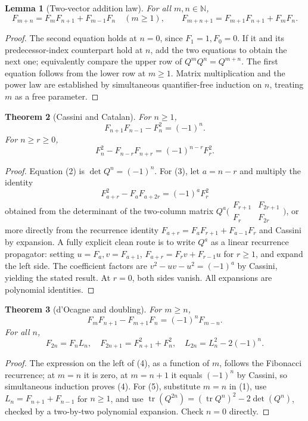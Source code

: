 \documentclass[11pt]{article}
\newtheorem{theorem}{Theorem}[section]
\newtheorem{lemma}[theorem]{Lemma}
\newcommand{\N}{\mathbb N}\newcommand{\Z}{\mathbb Z}
\begin{document}
\begin{lemma}[Two-vector addition law]\label{lem:add}
For all $m,n\in\N$,
\[ F_{m+n}=F_mF_{n+1}+F_{m-1}F_n\quad(m\ge1),\qquad F_{m+n+1}=F_{m+1}F_{n+1}+F_mF_n.\tag{1}\]
\end{lemma}
\begin{proof}
The second equation holds at $n=0$, since $F_1=1,F_0=0$. If it and its predecessor-index counterpart hold at $n$, add the two equations to obtain the next one; equivalently compare the upper row of $Q^mQ^n=Q^{m+n}$. The first equation follows from the lower row at $m\ge1$. Matrix multiplication and the power law are established by simultaneous quantifier-free induction on $n$, treating $m$ as a free parameter.
\end{proof}
\begin{theorem}[Cassini and Catalan]
For $n\ge1$,
\[F_{n+1}F_{n-1}-F_n^2=(-1)^n.\tag{2}\]
For $n\ge r\ge0$,
\[F_n^2-F_{n-r}F_{n+r}=(-1)^{n-r}F_r^2.\tag{3}\]
\end{theorem}
\begin{proof}
Equation (2) is $\det Q^n=(-1)^n$. For (3), let $a=n-r$ and multiply the identity
\[F_{a+r}^2-F_aF_{a+2r}=(-1)^aF_r^2\]
obtained from the determinant of the two-column matrix $Q^a\bigl(\begin{smallmatrix}F_{r+1}&F_{2r+1}\\F_r&F_{2r}\end{smallmatrix}\bigr)$, or more directly from the recurrence identity $F_{a+r}=F_aF_{r+1}+F_{a-1}F_r$ and Cassini by expansion. A fully explicit clean route is to write $Q^a$ as a linear recurrence propagator: setting $u=F_a,v=F_{a+1}$, $F_{a+r}=F_rv+F_{r-1}u$ for $r\ge1$, and expand the left side. The coefficient factors are $v^2-uv-u^2=(-1)^a$ by Cassini, yielding the stated result. At $r=0$, both sides vanish. All expansions are polynomial identities.
\end{proof}
\begin{theorem}[d'Ocagne and doubling]
For $m\ge n$, 
\[F_mF_{n+1}-F_{m+1}F_n=(-1)^nF_{m-n}.\tag{4}\]
For all $n$, 
\[F_{2n}=F_nL_n,\quad F_{2n+1}=F_{n+1}^2+F_n^2,\quad L_{2n}=L_n^2-2(-1)^n.\tag{5}\]
\end{theorem}
\begin{proof}
The expression on the left of (4), as a function of $m$, follows the Fibonacci recurrence; at $m=n$ it is zero, at $m=n+1$ it equals $(-1)^n$ by Cassini, so simultaneous induction proves (4). For (5), substitute $m=n$ in (1), use $L_n=F_{n+1}+F_{n-1}$ for $n\ge1$, and use $\operatorname{tr}(Q^{2n})=(\operatorname{tr}Q^n)^2-2\det(Q^n)$, checked by a two-by-two polynomial expansion. Check $n=0$ directly.
\end{proof}
\end{document}
